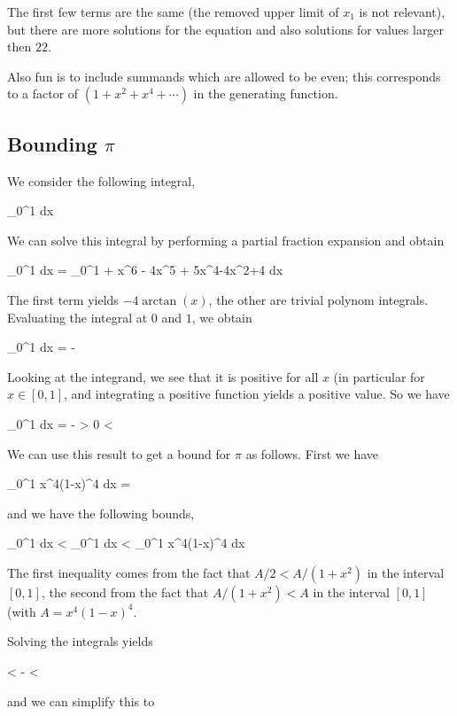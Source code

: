The first few terms are the same (the removed upper limit of $x_1$ is not relevant), but there are more solutions for the equation and also solutions for values larger then $22$.

Also fun is to include summands which are allowed to be even; this corresponds to a factor of $(1+x^2+x^4 + \cdots)$ in the generating function.


\subsection{Bounding $\pi$}

We consider the following integral,

\bee
\int_0^1  dx
\eee

We can solve this integral by performing a partial fraction expansion and obtain

\bee
\int_0^1  dx = \int_0^1  + x^6 - 4x^5 + 5x^4-4x^2+4 dx
\eee

The first term yields $-4 \arctan(x)$, the other are trivial polynom integrals. Evaluating the integral at $0$ and $1$, we obtain

\bee
\int_0^1  dx =  - \pi
\eee

Looking at the integrand, we see that it is positive for all $x$ (in particular for $x \in [0,1]$, and integrating a positive function yields a positive value. So we have

\bee
\int_0^1  dx =  - \pi > 0 \rightarrow \pi < 
\eee

We can use this result to get a bound for $\pi$ as follows. First we have

\bee
\int_0^1 x^4(1-x)^4 dx = 
\eee

and we have the following bounds,

\bee
\int_0^1  dx < \int_0^1  dx < \int_0^1 x^4(1-x)^4 dx
\eee

The first inequality comes from the fact that $A/2 < A/(1+x^2)$ in the interval $[0,1]$, the second from the fact that $A/(1+x^2) < A$ in the interval $[0,1]$ (with $A = x^4(1-x)^4$.

Solving the integrals yields

\bee
{} <   - \pi < 
\eee

and we can simplify this to

